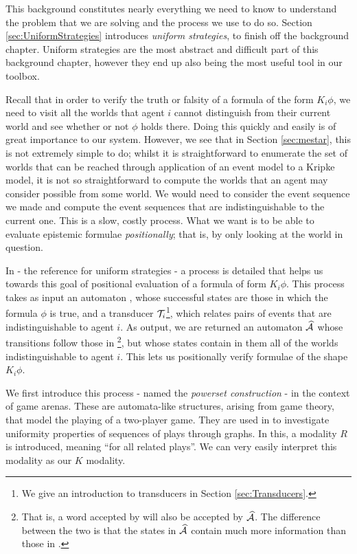 \documentclass[10pt, a4paper]{report}
\begin{document}
This background constitutes nearly everything we need to know to understand the
problem that we are solving and the process we use to do so. Section
\ref{sec:UniformStrategies} introduces \emph{uniform strategies}, to finish off
the background chapter. Uniform strategies are the most abstract and difficult part of
this background chapter, however they end up also being the most useful tool in
our toolbox. 

Recall that in order to verify the truth or falsity of a formula of the form
$K_i \phi$, we need to visit all the worlds that agent $i$ cannot distinguish
from their current world and see whether or not $\phi$ holds there. Doing this
quickly and easily is of great importance to our system. However, we see that in
Section \ref{sec:mestar}, this is not extremely simple to do; whilst it is
straightforward to enumerate the set of worlds that can be reached through
application of an event model to a Kripke model, it is not so straightforward to
compute the worlds that an agent may consider possible from some world. We
would need to consider the event sequence we made and compute the event sequences
that are indistinguishable to the current one. This is a slow, costly process.
What we want is to be able to evaluate epistemic formulae \emph{positionally};
that is, by only looking at the world in question.

In \cite{UniformStrategies} - the reference for uniform strategies - a process
is detailed that helps us towards this goal of positional evaluation of a
formula of form $K_i \phi$. This process takes as input an automaton ,
whose successful states are those in which the formula $\phi$ is true, and a
transducer $\mathcal{T}_i$\footnote{We give an introduction to transducers in Section
  \ref{sec:Transducers}.}, which relates pairs of events that are
indistinguishable to agent $i$. As output, we are returned an automaton
$\widehat{\mathcal{A}}$ whose transitions follow those in \footnote{That is,
  a word accepted by  will also be accepted by $\widehat{\mathcal{A}}$. The
  difference between the two is that the states in $\widehat{\mathcal{A}}$ contain
  much more information than those in .}, but whose states
contain in them all of the worlds indistinguishable to agent $i$. This lets us
positionally verify formulae of the shape $K_i \phi$.

We first introduce this process - named the \emph{powerset construction} - in
the context of game arenas. These are automata-like structures, arising from
game theory, that model the playing of a two-player game. They are used in
\cite{UniformStrategies} to investigate uniformity properties of sequences of
plays through graphs. In this, a modality $R$ is introduced, meaning ``for all
related plays''. We can very easily interpret this modality as our $K$ modality. 
\end{document}
